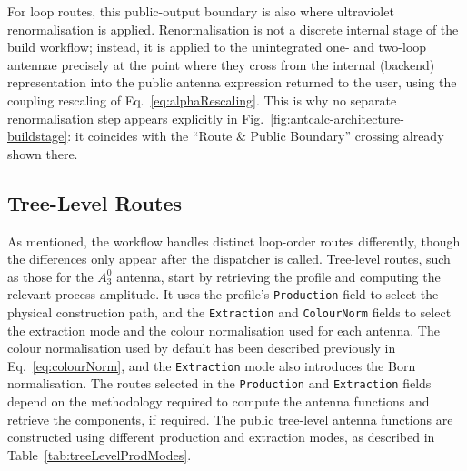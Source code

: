 

For loop routes, this public-output boundary is also where ultraviolet renormalisation is
applied. Renormalisation is not a discrete internal stage of the build workflow; instead, it is
applied to the unintegrated one- and two-loop antennae precisely at the point where they cross
from the internal (backend) representation into the public antenna expression returned to the
user, using the coupling rescaling of Eq.~\eqref{eq:alphaRescaling}. This is why no separate
renormalisation step appears explicitly in Fig.~\ref{fig:antcalc-architecture-buildstage}: it
coincides with the ``Route \& Public Boundary'' crossing already shown there.

\subsection{Tree-Level Routes}\label{subsec:treeLevelRoutes}

As mentioned, the workflow handles distinct loop-order routes differently, though the differences only appear 
after the dispatcher is called. Tree-level routes, such as those for the $A_3^0$ antenna, start by retrieving 
the profile and computing the relevant 
process amplitude. It uses the profile's \texttt{Production} field to select the physical construction path,
and the \texttt{Extraction} and \texttt{ColourNorm} fields to select the extraction mode and 
the colour normalisation used for each antenna. The colour normalisation used by default 
has been described previously in Eq.~\eqref{eq:colourNorm}, and the 
\texttt{Extraction} mode 
also introduces the Born normalisation.
The routes selected in the 
\texttt{Production} and \texttt{Extraction} fields
depend on the methodology required to compute the antenna functions and retrieve the components, if required. 
The public tree-level antenna functions are constructed using different production
and extraction modes, as described in 
Table~\ref{tab:treeLevelProdModes}.

